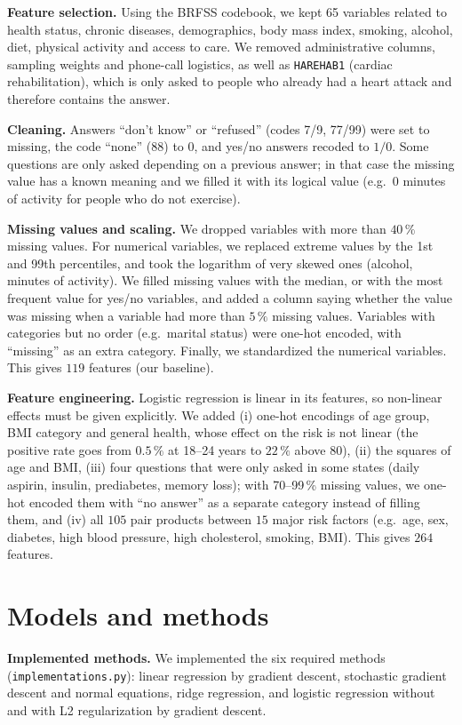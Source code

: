\documentclass[10pt,conference,compsocconf]{IEEEtran}
\begin{document}
\textbf{Feature selection.} Using the BRFSS codebook, we kept 65 variables related to
health status, chronic diseases, demographics, body mass index, smoking, alcohol, diet,
physical activity and access to care. We removed administrative columns, sampling
weights and phone-call logistics, as well as \texttt{HAREHAB1} (cardiac rehabilitation),
which is only asked to people who already had a heart attack and therefore contains
the answer.

\textbf{Cleaning.} Answers ``don't know'' or ``refused'' (codes 7/9, 77/99) were set to
missing, the code ``none'' (88) to $0$, and yes/no answers recoded to $1/0$. Some
questions are only asked depending on a previous answer; in that case the missing value
has a known meaning and we filled it with its logical value (e.g.\ $0$ minutes of
activity for people who do not exercise).

\textbf{Missing values and scaling.} We dropped variables with more than $40\,\%$ missing values. For numerical variables, we replaced extreme values by the 1st and 99th percentiles,
and took the logarithm of very skewed ones (alcohol, minutes of activity). We filled
missing values with the median, or with the most frequent value for yes/no variables,
and added a column saying whether the value was missing when a variable had more than
$5\,\%$ missing values. Variables with categories but no order (e.g.\ marital status)
were one-hot encoded, with ``missing'' as an extra category. Finally, we standardized
the numerical variables. This gives $119$ features (our baseline).

\textbf{Feature engineering.} Logistic regression is linear in its features, so
non-linear effects must be given explicitly. We added (i) one-hot encodings of age group,
BMI category and general health, whose effect on the risk is not linear (the positive
rate goes from $0.5\,\%$ at 18--24 years to $22\,\%$ above 80), (ii) the squares of age
and BMI, (iii) four questions that were only asked in some states (daily aspirin,
insulin, prediabetes, memory loss); with 70--99\,\% missing values, we one-hot encoded
them with ``no answer'' as a separate category instead of filling them, and (iv) all
$105$ pair products between $15$ major risk factors (e.g.\ age, sex, diabetes, high
blood pressure, high cholesterol, smoking, BMI). This gives $264$ features.

\section{Models and methods}
\label{sec:models}
\textbf{Implemented methods.} We implemented the six required methods
(\texttt{implementations.py}): linear regression by gradient descent, stochastic
gradient descent and normal equations, ridge regression, and logistic regression
without and with L2 regularization by gradient descent.
\end{document}
